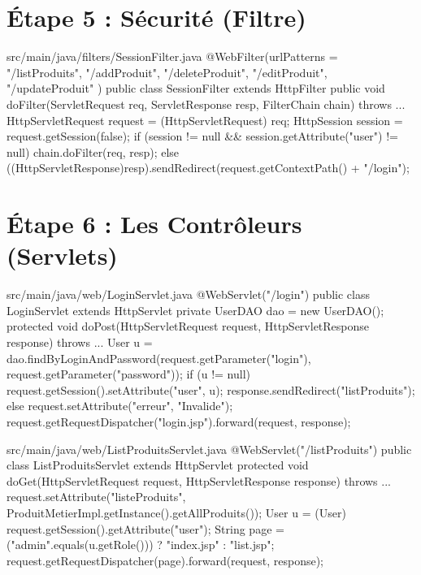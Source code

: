 \documentclass[12pt,a4paper]{article}
\begin{document}
\section{Étape 5 : Sécurité (Filtre)}
\begin{codeholder}{src/main/java/filters/SessionFilter.java}
@WebFilter(urlPatterns = { "/listProduits", "/addProduit", "/deleteProduit", "/editProduit", "/updateProduit" })
public class SessionFilter extends HttpFilter {
    public void doFilter(ServletRequest req, ServletResponse resp, FilterChain chain) throws ... {
        HttpServletRequest request = (HttpServletRequest) req;
        HttpSession session = request.getSession(false);
        if (session != null && session.getAttribute("user") != null) {
            chain.doFilter(req, resp);
        } else {
            ((HttpServletResponse)resp).sendRedirect(request.getContextPath() + "/login");
        }
    }
}
\end{codeholder}

\section{Étape 6 : Les Contrôleurs (Servlets)}
\begin{codeholder}{src/main/java/web/LoginServlet.java}
@WebServlet("/login")
public class LoginServlet extends HttpServlet {
    private UserDAO dao = new UserDAO();
    protected void doPost(HttpServletRequest request, HttpServletResponse response) throws ... {
        User u = dao.findByLoginAndPassword(request.getParameter("login"), request.getParameter("password"));
        if (u != null) {
            request.getSession().setAttribute("user", u);
            response.sendRedirect("listProduits");
        } else {
            request.setAttribute("erreur", "Invalide");
            request.getRequestDispatcher("login.jsp").forward(request, response);
        }
    }
}
\end{codeholder}

\begin{codeholder}{src/main/java/web/ListProduitsServlet.java}
@WebServlet("/listProduits")
public class ListProduitsServlet extends HttpServlet {
    protected void doGet(HttpServletRequest request, HttpServletResponse response) throws ... {
        request.setAttribute("listeProduits", ProduitMetierImpl.getInstance().getAllProduits());
        User u = (User) request.getSession().getAttribute("user");
        String page = ("admin".equals(u.getRole())) ? "index.jsp" : "list.jsp";
        request.getRequestDispatcher(page).forward(request, response);
    }
}
\end{codeholder}
\end{document}
